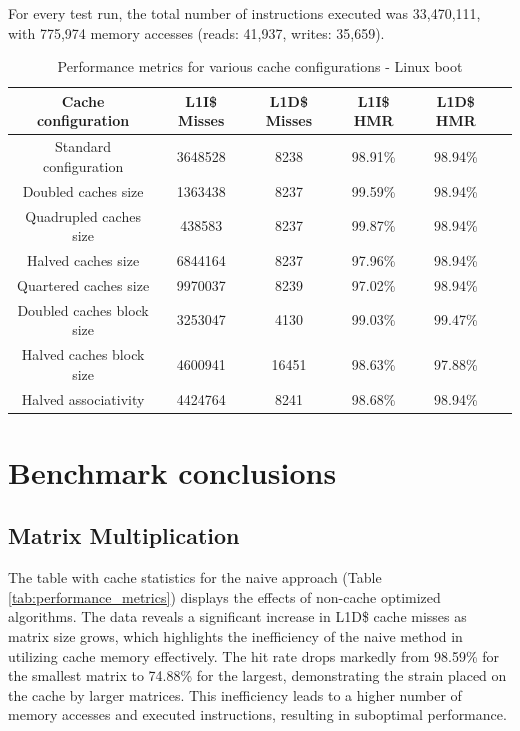 \noindent For every test run, the total number of instructions executed was 33,470,111, with 775,974 memory accesses (reads: 41,937, writes: 35,659).

\begin{center}
\begin{table}[!htbp]
\centering
\begin{tabular}{|c|c|c|c|c|c|}
\hline
\textbf{Cache configuration}  & \textbf{L1I\$ Misses} & \textbf{L1D\$ Misses} & \textbf{L1I\$ HMR} & \textbf{L1D\$ HMR}\\ \hline
Standard configuration & 3648528 & 8238 & 98.91\% & 98.94\% \\ \hline
Doubled caches size & 1363438 & 8237 & 99.59\% & 98.94\% \\ \hline
Quadrupled caches size & 438583 & 8237 & 99.87\% & 98.94\% \\ \hline
Halved caches size & 6844164 & 8237 & 97.96\% & 98.94\% \\ \hline
Quartered caches size & 9970037 & 8239 & 97.02\% & 98.94\% \\ \hline
Doubled caches block size & 3253047 & 4130 & 99.03\% & 99.47\% \\ \hline
Halved caches block size & 4600941 & 16451 & 98.63\% & 97.88\% \\ \hline
Halved associativity & 4424764 & 8241 & 98.68\% & 98.94\% \\ \hline
\end{tabular}
\caption{Performance metrics for various cache configurations - Linux boot}
\label{tab:performance_metrics_linux}
\end{table}
\end{center}

\section{Benchmark conclusions}

\subsection*{Matrix Multiplication}

The table with cache statistics for the naive approach (Table \ref{tab:performance_metrics}) displays the effects of non-cache optimized algorithms. The data reveals a significant
increase in L1D\$ cache misses as matrix size grows, which highlights the inefficiency of the naive method in utilizing cache memory effectively. The hit rate drops markedly from
98.59\% for the smallest matrix to 74.88\% for the largest, demonstrating the strain placed on the cache by larger matrices. This inefficiency leads to a higher number of memory
accesses and executed instructions, resulting in suboptimal performance.

